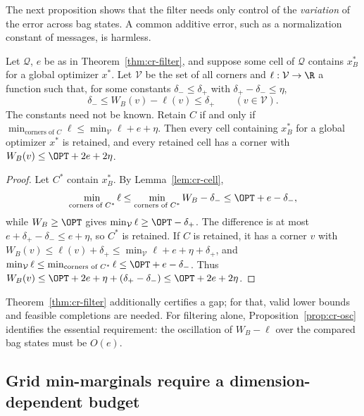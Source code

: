 The next proposition shows that the filter needs only control of the
\emph{variation} of the error across bag states. A common additive error,
such as a normalization constant of messages, is harmless.

\begin{proposition}\label{prop:cr-osc}
Let $\mathcal Q$, $e$ be as in Theorem~\ref{thm:cr-filter}, and suppose
some cell of $\mathcal Q$ contains $x^*_B$ for a global optimizer $x^*$.
Let $\mathcal V$ be the set of all corners and $\ell:\mathcal V\to\R$ a
function such that, for some constants $\delta_-\le\delta_+$ with
$\delta_+-\delta_-\le\eta$,
\[
\delta_-\le W_B(v)-\ell(v)\le\delta_+\qquad(v\in\mathcal V).
\]
The constants need not be known. Retain $C$ if and only if
$\min_{\text{corners of }C}\ell\le\min_{\mathcal V}\ell+e+\eta$. Then every
cell containing $x^*_B$ for a global optimizer $x^*$ is retained, and
every retained cell has a corner with $W_B(v)\le\OPT+2e+2\eta$.
\end{proposition}
\begin{proof}
Let $C^*$ contain $x^*_B$. By Lemma~\ref{lem:cr-cell},
\[
\min_{\text{corners of }C^*}\ell\le\min_{\text{corners of }C^*}W_B-\delta_-
\le\OPT+e-\delta_-,
\]
while $W_B\ge\OPT$ gives
$\min_{\mathcal V}\ell\ge\OPT-\delta_+$. The difference is at most
$e+\delta_+-\delta_-\le e+\eta$, so $C^*$ is retained. If $C$ is retained,
it has a corner $v$ with
$W_B(v)\le\ell(v)+\delta_+\le\min_{\mathcal V}\ell+e+\eta+\delta_+$, and
$\min_{\mathcal V}\ell\le\min_{\text{corners of }C^*}\ell\le\OPT+e-\delta_-$.
Thus $W_B(v)\le\OPT+2e+\eta+(\delta_+-\delta_-)\le\OPT+2e+2\eta$.
\end{proof}

Theorem~\ref{thm:cr-filter} additionally certifies a gap; for that, valid
lower bounds and feasible completions are needed. For filtering alone,
Proposition~\ref{prop:cr-osc} identifies the essential requirement: the
oscillation of $W_B-\ell$ over the compared bag states must be
$O(e)$.

\subsection{Grid min-marginals require a dimension-dependent budget}\label{sec:cr-star}


